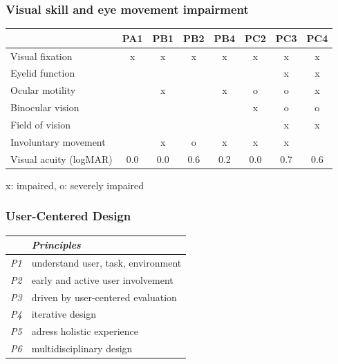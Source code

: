 \documentclass{kul-ulille-beamer}
\begin{document}
\begin{frame}[noframenumbering]
  \frametitle{Visual skill and eye movement impairment}
  \newcommand{\skill}{}
  \newcommand{\noskill}{x}
  \newcommand{\snoskill}{o}

  \begin{tabular}{l|ccccccc}
                            & PA1      & PB1      & PB2       & PB4      & PC2       & PC3       & PC4 \\ \hline
    \small Visual fixation         & \noskill & \noskill & \noskill  & \noskill & \noskill  & \noskill  & \noskill \\
    \small Eyelid function         & \skill   & \skill   & \skill    & \skill   &  \skill  & \noskill  & \noskill \\
    \small Ocular motility         & \skill   & \noskill & \skill    & \noskill & \snoskill & \snoskill & \noskill\\
    \small Binocular vision        & \skill   & \skill   & \skill    & \skill   & \noskill  & \snoskill & \snoskill \\
    \small Field of vision         & \skill   & \skill   & \skill    & \skill   & \skill    & \noskill  & \noskill \\
    \small Involuntary movement    & \skill   & \noskill & \snoskill  &
    \noskill &  \noskill  & \noskill  & \skill \\ \hline
  Visual acuity (logMAR)  & 0.0      & 0.0      & 0.6       & 0.2      & 0.0       & 0.7  & 0.6\\
  \end{tabular}
  \bigskip

  x: impaired, o: severely impaired
\end{frame}


\begin{frame}[c, noframenumbering]
\frametitle{User-Centered Design}

  \begin{minipage}[c]{.5\textwidth}
  \begin{tabular}{|l|l|}
    \hline
     & \emph{Principles} \\ \hline
     \emph{P1} & understand user, task, environment \\
     \emph{P2} & early and active user involvement \\
     \emph{P3} & driven by user-centered evaluation \\
     \emph{P4} & iterative design \\
     \emph{P5} & adress holistic experience \\
     \emph{P6} & multidisciplinary design \\
    \hline
  \end{tabular}
  \end{minipage}\hfill%
  \begin{minipage}[c]{.4\textwidth}
  \end{minipage}

\end{frame}
\end{document}
